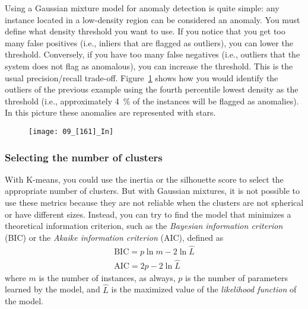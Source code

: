Using a Gaussian mixture model for anomaly detection is quite simple: any instance located in a low-density region can be considered an anomaly. You must define what density threshold you want to use. If you notice that you get too many false positives (i.e., inliers that are flagged as outliers), you can lower the threshold. Conversely, if you have too many false negatives (i.e., outliers that the system does not flag as anomalous), you can increase the threshold. This is the usual precision/recall trade-off.
Figure~\ref{09_[161]_In} shows how you would identify the outliers of the previous example using the fourth percentile lowest density as the threshold (i.e., approximately \SI{4}{\percent} of the instances will be flagged as anomalies). In this picture these anomalies are represented with stars.
\begin{figure}[h!t]
\centering
\texttt{[image: 09\_[161]\_In]}
\caption{}\label{09_[161]_In}
\end{figure}
\subsubsection{Selecting the number of clusters}
With K-means, you could use the inertia or the silhouette score to select the appropriate number of clusters. But with Gaussian mixtures, it is not possible to use these metrics because they are not reliable when the clusters are not spherical or have different sizes. Instead, you can try to find the model that minimizes a theoretical information criterion, such as the \emph{Bayesian information criterion} (BIC) or the \emph{Akaike information criterion} (AIC), defined as
\begin{gather}
\text{BIC}=p\ln{m}-2\ln{\widehat{L}}\\
\text{AIC}=2p-2\ln{\widehat{L}}
\end{gather}
where $m$ is the number of instances, as always, $p$ is the number of parameters learned by the model, and $\widehat{L}$ is the maximized value of the \emph{likelihood function} of the model.

